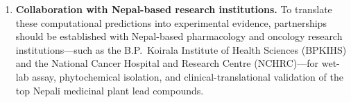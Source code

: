 \begin{enumerate}
    \item \textbf{Collaboration with Nepal-based research institutions.} To translate
          these computational predictions into experimental evidence, partnerships should
          be established with Nepal-based pharmacology and oncology research institutions---such
          as the B.P.\ Koirala Institute of Health Sciences (BPKIHS) and the National
          Cancer Hospital and Research Centre (NCHRC)---for wet-lab assay, phytochemical
          isolation, and clinical-translational validation of the top Nepali medicinal
          plant lead compounds.
\end{enumerate}
